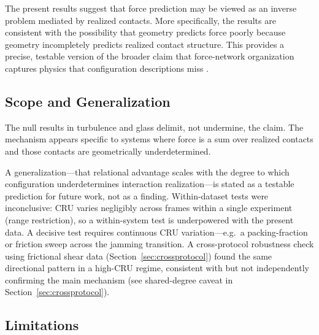 \documentclass[11pt,a4paper]{article}
\begin{document}
The present results suggest that force prediction may be viewed as an inverse problem mediated by realized contacts. More specifically, the results are consistent with the possibility that geometry predicts force poorly because geometry incompletely predicts realized contact structure. This provides a precise, testable version of the broader claim that force-network organization captures physics that configuration descriptions miss \cite{ostojic2006,tordesillas2007}.

\subsection{Scope and Generalization}

The null results in turbulence and glass delimit, not undermine, the claim.
The mechanism appears specific to systems where force is a sum over realized contacts and those contacts are geometrically underdetermined.

A generalization---that relational advantage scales with the degree to which configuration underdetermines interaction realization---is stated as a testable prediction for future work, not as a finding.
Within-dataset tests were inconclusive: CRU varies negligibly across frames within a single experiment (range restriction), so a within-system test is underpowered with the present data.
A decisive test requires continuous CRU variation---e.g.\ a packing-fraction or friction sweep across the jamming transition.
A cross-protocol robustness check using frictional shear data (Section~\ref{sec:crossprotocol}) found the same directional pattern in a high-CRU regime, consistent with but not independently confirming the main mechanism (see shared-degree caveat in Section~\ref{sec:crossprotocol}).

\subsection{Limitations}
\end{document}
